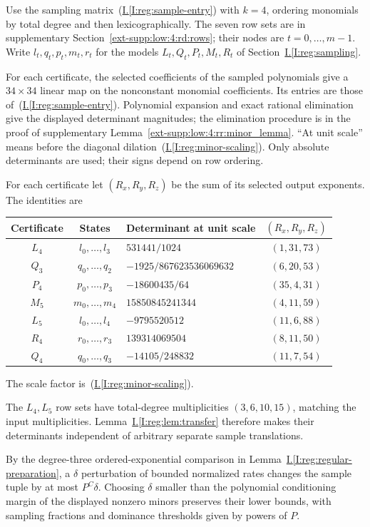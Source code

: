 \documentclass[11pt]{amsart}
\theoremstyle{definition}
\theoremstyle{remark}
\numberwithin{equation}{section}
\newcommand{\partIref}[1]{\hyperref[I:#1]{I.\ref*{I:#1}}}
\newcommand{\partIeqref}[1]{\textup{(\partIref{#1})}}
\begin{document}
Use the sampling matrix~\partIeqref{reg:sample-entry} with $k=4$, ordering monomials by total degree and then lexicographically. The seven row sets are in supplementary Section~\ref{ext-supp:low:4:rd:rows}; their nodes are $t=0,\ldots,m-1$. Write $l_t,q_t,p_t,m_t,r_t$ for the models $L_t,Q_t,P_t,M_t,R_t$ of Section~\partIref{reg:sampling}.

For each certificate, the selected coefficients of the sampled polynomials give a $34\times34$ linear map on the nonconstant monomial coefficients. Its entries are those of~\partIeqref{reg:sample-entry}. Polynomial expansion and exact rational elimination give the displayed determinant magnitudes; the elimination procedure is in the proof of supplementary Lemma~\ref{ext-supp:low:4:rr:minor_lemma}. ``At unit scale'' means before the diagonal dilation~\partIeqref{reg:minor-scaling}. Only absolute determinants are used; their signs depend on row ordering.

For each certificate let $(R_x,R_y,R_z)$ be the sum of its selected output exponents. The identities are
\begin{center}
\begin{tabular}{cclc}
Certificate & States & Determinant at unit scale & $(R_x,R_y,R_z)$\\\hline
$L_4$ & $l_0,\ldots,l_3$ & $531441/1024$ & $(1,31,73)$\\
$Q_3$ & $q_0,\ldots,q_2$ & $-1925/867623536069632$ & $(6,20,53)$\\
$P_4$ & $p_0,\ldots,p_3$ & $-18600435/64$ & $(35,4,31)$\\
$M_5$ & $m_0,\ldots,m_4$ & $15850845241344$ & $(4,11,59)$\\
$L_5$ & $l_0,\ldots,l_4$ & $-9795520512$ & $(11,6,88)$\\
$R_4$ & $r_0,\ldots,r_3$ & $139314069504$ & $(8,11,50)$\\
$Q_4$ & $q_0,\ldots,q_3$ & $-14105/248832$ & $(11,7,54)$
\end{tabular}
\end{center}
The scale factor is~\partIeqref{reg:minor-scaling}.

The $L_4,L_5$ row sets have total-degree multiplicities $(3,6,10,15)$, matching the input multiplicities. Lemma~\partIref{reg:lem:transfer} therefore makes their determinants independent of arbitrary separate sample translations.

By the degree-three ordered-exponential comparison in Lemma~\partIref{reg:regular-preparation}, a $\delta$ perturbation of bounded normalized rates changes the sample tuple by at most $P^C\delta$. Choosing $\delta$ smaller than the polynomial conditioning margin of the displayed nonzero minors preserves their lower bounds, with sampling fractions and dominance thresholds given by powers of $P$.
\end{document}
